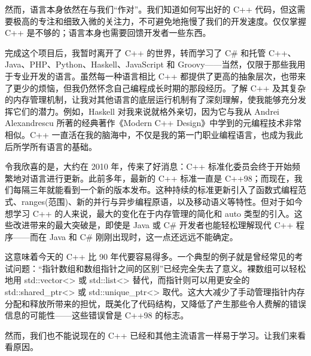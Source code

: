 然而，语言本身依然在与我们“作对”。我们知道如何写出好的 C++ 代码，但这需要极高的专注和细致入微的关注力，不可避免地拖慢了我们的开发速度。仅仅掌握 C++ 是不够的；语言本身也需要回馈开发者一些东西。

完成这个项目后，我暂时离开了 C++ 的世界，转而学习了 C\# 和托管 C++、Java、PHP、Python、Haskell、JavaScript 和 Groovy——当然，仅限于那些我用于专业开发的语言。虽然每一种语言相比 C++ 都提供了更高的抽象层次，也带来了更少的烦恼，但我仍然怀念自己编程成长时期的那段经历。了解 C++ 及其复杂的内存管理机制，让我对其他语言的底层运行机制有了深刻理解，使我能够充分发挥它们的潜力。例如，Haskell 对我来说就格外亲切，因为它与我从 Andrei Alexandrescu 所著的经典著作《Modern C++ Design》中学到的元编程技术非常相似。C++ 一直活在我的脑海中，不仅是我的第一门职业编程语言，也成为我此后所学所有语言的基础。

令我欣喜的是，大约在 2010 年，传来了好消息：C++ 标准化委员会终于开始频繁地对语言进行更新。此前多年，最新的 C++ 标准一直是 C++98；而现在，我们每隔三年就能看到一个新的版本发布。这种持续的标准更新引入了函数式编程范式、ranges(范围)、新的并行与异步编程原语，以及移动语义等特性。但对于如今想学习 C++ 的人来说，最大的变化在于内存管理的简化和 auto 类型的引入。这些改进带来的最大突破是，即使是 Java 或 C\# 开发者也能轻松理解现代 C++ 程序——而在 Java 和 C\# 刚刚出现时，这一点还远远不能确定。

这意味着今天的 C++ 比 90 年代要容易得多。一个典型的例子就是曾经常见的考试问题：“指针数组和数组指针之间的区别”已经完全失去了意义。裸数组可以轻松地用 std::vector<> 或 std::list<> 替代，而指针则可以用更安全的 std::shared\_ptr<> 或 std::unique\_ptr<> 取代。这大大减少了手动管理指针内存分配和释放所带来的担忧，既美化了代码结构，又降低了产生那些令人费解的错误信息的可能性——这些错误曾是 C++98 的标志。

然而，我们也不能说现在的 C++ 已经和其他主流语言一样易于学习。让我们来看看原因。
























